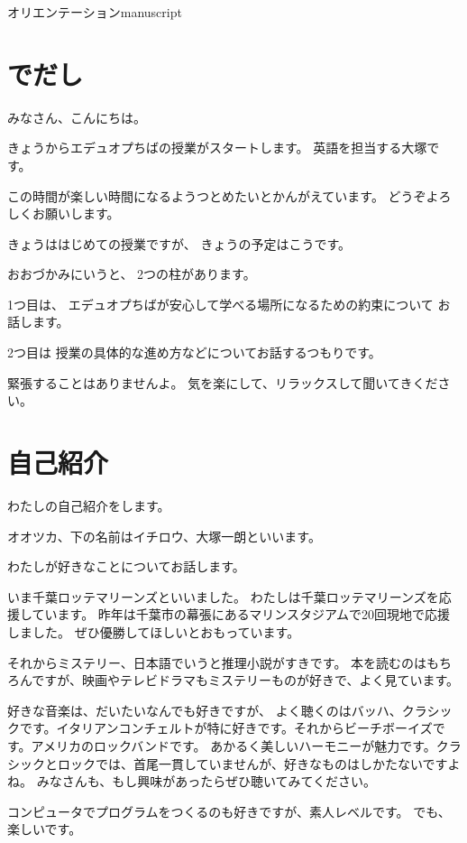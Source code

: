 \documentclass[12pt]{jlreq}
\begin{document}

\begin{center}\Large
 オリエンテーションmanuscript
\end{center}

\bigskip

\section{でだし}
みなさん、こんにちは。

きょうからエデュオプちばの授業がスタートします。
英語を担当する大塚です。

この時間が楽しい時間になるようつとめたいとかんがえています。
どうぞよろしくお願いします。

きょうははじめての授業ですが、
きょうの予定はこうです。

おおづかみにいうと、
2つの柱があります。

1つ目は、
エデュオプちばが安心して学べる場所になるための約束について
お話します。

2つ目は
授業の具体的な進め方などについてお話するつもりです。

緊張することはありませんよ。
気を楽にして、リラックスして聞いてきください。


\newpage
\section{自己紹介}

わたしの自己紹介をします。

オオツカ、下の名前はイチロウ、大塚一朗といいます。

わたしが好きなことについてお話します。

いま千葉ロッテマリーンズといいました。
わたしは千葉ロッテマリーンズを応援しています。
昨年は千葉市の幕張にあるマリンスタジアムで20回現地で応援しました。
ぜひ優勝してほしいとおもっています。

それからミステリー、日本語でいうと推理小説がすきです。
本を読むのはもちろんですが、映画やテレビドラマもミステリーものが好きで、よく見ています。

好きな音楽は、だいたいなんでも好きですが、
よく聴くのはバッハ、クラシックです。イタリアンコンチェルトが特に好きです。それからビーチボーイズです。アメリカのロックバンドです。
あかるく美しいハーモニーが魅力です。クラシックとロックでは、首尾一貫していませんが、好きなものはしかたないですよね。
みなさんも、もし興味があったらぜひ聴いてみてください。

コンピュータでプログラムをつくるのも好きですが、素人レベルです。
でも、楽しいです。
\end{document}
